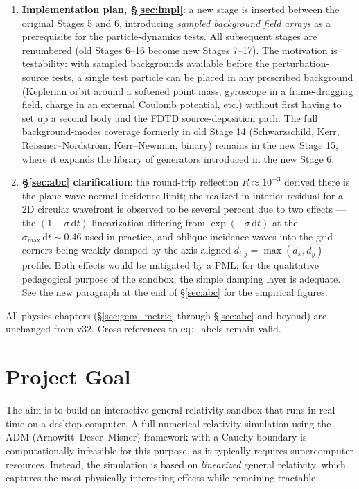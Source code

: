 \documentclass[11pt,a4paper]{article}
\newcommand{\dd}{\mathrm{d}}
\begin{document}
\begin{enumerate}
  \item \textbf{Implementation plan, §\ref{sec:impl}}: a new stage is inserted between the original Stages 5 and 6, introducing \emph{sampled background field arrays} as a prerequisite for the particle-dynamics tests.  All subsequent stages are renumbered (old Stages 6--16 become new Stages 7--17).  The motivation is testability: with sampled backgrounds available before the perturbation-source tests, a single test particle can be placed in any prescribed background (Keplerian orbit around a softened point mass, gyroscope in a frame-dragging field, charge in an external Coulomb potential, etc.) without first having to set up a second body and the FDTD source-deposition path.  The full background-modes coverage formerly in old Stage 14 (Schwarzschild, Kerr, Reissner--Nordstr\"om, Kerr--Newman, binary) remains in the new Stage 15, where it expands the library of generators introduced in the new Stage 6.
  \item \textbf{§\ref{sec:abc} clarification}: the round-trip reflection $R\approx10^{-3}$ derived there is the plane-wave normal-incidence limit; the realized in-interior residual for a 2D circular wavefront is observed to be several percent due to two effects --- the $(1-\sigma\,\dd t)$ linearization differing from $\exp(-\sigma\,\dd t)$ at the $\sigma_{\max}\,\dd t\sim0.46$ used in practice, and oblique-incidence waves into the grid corners being weakly damped by the axis-aligned $d_{i,j}=\max(d_x,d_y)$ profile.  Both effects would be mitigated by a PML; for the qualitative pedagogical purpose of the sandbox, the simple damping layer is adequate.  See the new paragraph at the end of §\ref{sec:abc} for the empirical figures.
\end{enumerate}

All physics chapters (§\ref{sec:gem_metric} through §\ref{sec:abc} and beyond) are unchanged from v32.  Cross-references to \texttt{eq:} labels remain valid.

\newpage

\section{Project Goal}

The aim is to build an interactive general relativity sandbox that runs in real time on a desktop computer.  A full numerical relativity simulation using the ADM (Arnowitt--Deser--Misner) framework with a Cauchy boundary is computationally infeasible for this purpose, as it typically requires supercomputer resources.  Instead, the simulation is based on \emph{linearized} general relativity, which captures the most physically interesting effects while remaining tractable.
\end{document}
